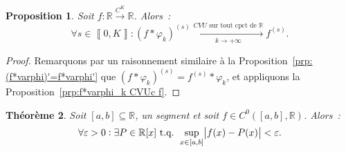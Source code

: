 \documentclass{report}
\newtheorem{thm}{Théorème}[chapter]
\newtheorem{prp}[thm]{Proposition}
\theoremstyle{definition}
\theoremstyle{remark}
\newcommand{\R}{\mathbb R}
\newcommand{\tq}{\text{ t.q. }}
\newcommand{\CONV}[5]{\xrightarrow[#2 \to #3]{#4 \text{ #5 } #1}}
\newcommand{\CVUc}[3]{\CONV{#1}{#2}{#3}{CVU}{sur tout cpct de}}
\newcommand{\intint}[2]{\left\llbracket#1, #2\right\rrbracket}
\newcommand{\toC}[1]{\xrightarrow{C^{#1}}}
\newcommand{\pinfty}{{+\infty}}
\begin{document}
			\begin{prp} Soit $f : \R \toC K \R$. Alors~:
			\[\forall s \in \intint 0K : \left(f*\varphi_k\right)^{(s)} \CVUc \R k\pinfty f^{(s)}.\]
			\end{prp}

			\begin{proof} Remarquons par un raisonnement similaire à la Proposition~\ref{prp:(f*varphi)'=f*varphi'} que $(f*\varphi_k)^{(s)} = f^{(s)}*\varphi_k$, et
			appliquons la Proposition~\ref{prp:f*varphi_k CVUc f}.
			\end{proof}

			\begin{thm} Soit $[a, b] \subseteq \R$, un segment et soit $f \in C^0([a, b], \R)$. Alors~:
			\[\forall \varepsilon > 0 : \exists P \in \R[x] \tq \sup_{x \in [a, b]}\abs {f(x)-P(x)} < \varepsilon.\]
			\end{thm}
\end{document}
